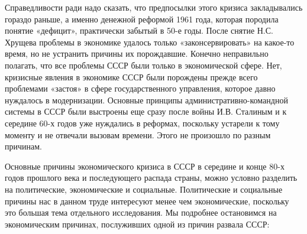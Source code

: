 \documentclass{article}
\begin{document}
\hfill

Справедливости ради надо сказать, что предпосылки этого кризиса закладывались гораздо раньше, а именно денежной реформой 1961 года, которая породила понятие «дефицит», практически забытый в 50-е годы. После снятие Н.С. Хрущева проблемы в экономике удалось только «законсервировать» на какое-то время, но не устранить причины их порождавшие. Конечно неправильно полагать, что все проблемы СССР были только в экономической сфере. Нет, кризисные явления в экономике СССР были порождены прежде всего проблемами «застоя» в сфере государственного управления, которое давно нуждалось в модернизации. Основные принципы административно-командной системы в СССР были выстроены еще сразу после войны И.В. Сталиным и к середине 60-х годов уже нуждались в реформах, поскольку устарели к тому моменту и не отвечали вызовам времени. Этого не произошло по разным причинам.

\hfill

Основные причины экономического кризиса в СССР в середине и конце 80-х годов прошлого века и последующего распада страны, можно условно разделить на политические, экономические и социальные. Политические и социальные причины нас в данном труде интересуют менее чем экономические, поскольку это большая тема отдельного исследования. Мы подробнее остановимся на экономическим причинах, послуживших одной из причин развала СССР:
\end{document}
